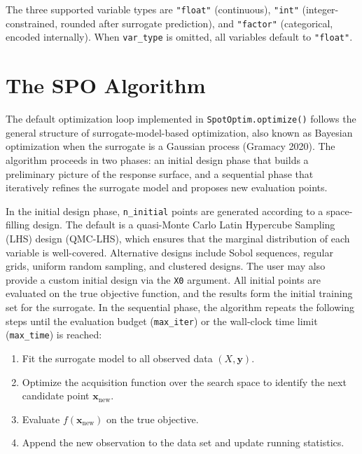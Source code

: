 \documentclass[
  twocolumn]{article}
\providecommand{\tightlist}{%
  \setlength{\itemsep}{0pt}\setlength{\parskip}{0pt}}
\begin{document}
The three supported variable types are \texttt{"float"} (continuous),
\texttt{"int"} (integer-constrained, rounded after surrogate
prediction), and \texttt{"factor"} (categorical, encoded internally).
When \texttt{var\_type} is omitted, all variables default to
\texttt{"float"}.

\section{The SPO Algorithm}\label{sec-algorithm}

The default optimization loop implemented in
\texttt{SpotOptim.optimize()} follows the general structure of
surrogate-model-based optimization, also known as Bayesian optimization
when the surrogate is a Gaussian process (Gramacy 2020). The algorithm
proceeds in two phases: an initial design phase that builds a
preliminary picture of the response surface, and a sequential phase that
iteratively refines the surrogate model and proposes new evaluation
points.

In the initial design phase, \texttt{n\_initial} points are generated
according to a space-filling design. The default is a quasi-Monte Carlo
Latin Hypercube Sampling (LHS) design (QMC-LHS), which ensures that the
marginal distribution of each variable is well-covered. Alternative
designs include Sobol sequences, regular grids, uniform random sampling,
and clustered designs. The user may also provide a custom initial design
via the \texttt{X0} argument. All initial points are evaluated on the
true objective function, and the results form the initial training set
for the surrogate. In the sequential phase, the algorithm repeats the
following steps until the evaluation budget (\texttt{max\_iter}) or the
wall-clock time limit (\texttt{max\_time}) is reached:

\begin{enumerate}
\def\labelenumi{\arabic{enumi}.}
\tightlist
\item
  Fit the surrogate model to all observed data \((X, \mathbf{y})\).
\item
  Optimize the acquisition function over the search space to identify
  the next candidate point \(\mathbf{x}_{\text{new}}\).
\item
  Evaluate \(f(\mathbf{x}_{\text{new}})\) on the true objective.
\item
  Append the new observation to the data set and update running
  statistics.
\end{enumerate}
\end{document}
